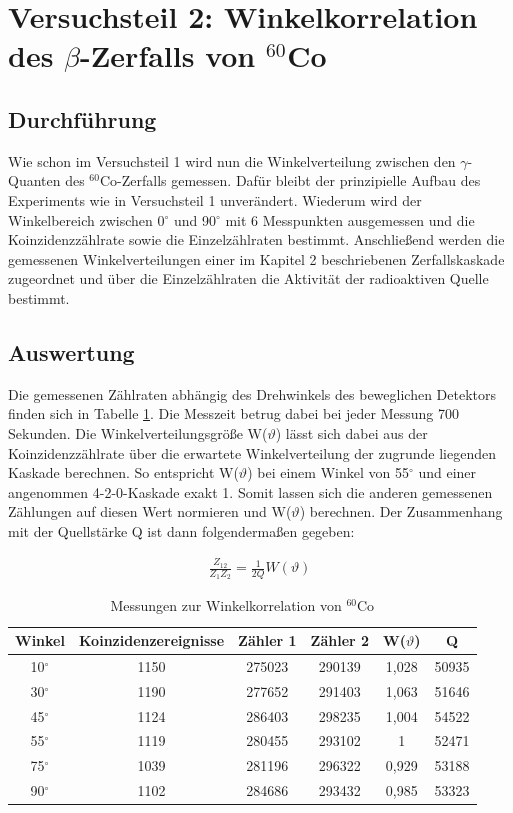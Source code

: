 \documentclass[11pt]{scrartcl}
\begin{document}
\section{Versuchsteil 2: Winkelkorrelation des $\beta$-Zerfalls von $^{60}$Co}

\subsection{Durchführung}

Wie schon im Versuchsteil 1 wird nun die Winkelverteilung zwischen den $\gamma$-Quanten des $^{60}$Co-Zerfalls gemessen. Dafür bleibt der prinzipielle Aufbau des Experiments wie in Versuchsteil 1 unverändert. Wiederum wird der Winkelbereich zwischen 0$^\circ$ und 90$^\circ$ mit 6 Messpunkten ausgemessen und die Koinzidenzzählrate sowie die Einzelzählraten bestimmt. Anschließend werden die gemessenen Winkelverteilungen einer im Kapitel 2 beschriebenen Zerfallskaskade zugeordnet und über die Einzelzählraten die Aktivität der radioaktiven Quelle bestimmt. 

\subsection{Auswertung}
Die gemessenen Zählraten abhängig des Drehwinkels des beweglichen Detektors finden sich in Tabelle \ref{Quelle}. Die Messzeit betrug dabei bei jeder Messung 700 Sekunden. Die Winkelverteilungsgröße W($\vartheta$) lässt sich dabei aus der Koinzidenzzählrate über die erwartete Winkelverteilung der zugrunde liegenden Kaskade berechnen. So entspricht W($\vartheta$) bei einem Winkel von 55$^\circ$ und einer angenommen 4-2-0-Kaskade exakt 1. Somit lassen sich die anderen gemessenen Zählungen auf diesen Wert normieren und W($\vartheta$) berechnen. Der Zusammenhang mit der Quellstärke Q ist dann folgendermaßen gegeben:

\begin{align}
\frac{Z_{12}}{Z_1Z_2}=\frac{1}{2Q}W(\vartheta)
\end{align}

\begin{table}[h]
	\caption{Messungen zur Winkelkorrelation von $^{60}$Co}
	\begin{tabular}{|c|c|c|c|c|c|}
	\hline
	 Winkel & Koinzidenzereignisse & Zähler 1 & Zähler 2 & W($\vartheta$) & Q\\ \hline
	 10$^\circ$ & 1150 & 275023 & 290139 & 1,028 & 50935\\ \hline
	 30$^\circ$ & 1190 & 277652 & 291403 & 1,063 & 51646\\ \hline
	 45$^\circ$ & 1124 & 286403 & 298235 & 1,004 & 54522\\ \hline
	 55$^\circ$ & 1119 & 280455 & 293102 & 1 & 52471\\ \hline
	 75$^\circ$ & 1039 & 281196 & 296322 & 0,929 & 53188\\ \hline
	 90$^\circ$ & 1102 & 284686 & 293432 & 0,985 & 53323\\ \hline
	\end{tabular}
\label{Quelle}
\end{table}
\end{document}
